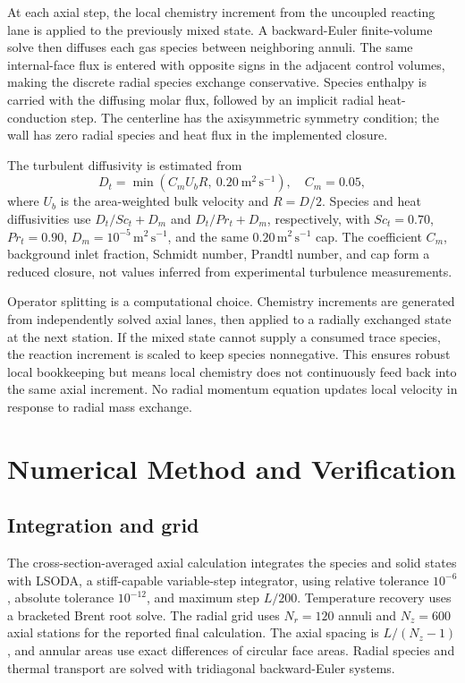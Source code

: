 \documentclass[journal]{IEEEtran}
\begin{document}
At each axial step, the local chemistry increment from the uncoupled reacting lane is applied to the previously mixed state. A backward-Euler finite-volume solve then diffuses each gas species between neighboring annuli. The same internal-face flux is entered with opposite signs in the adjacent control volumes, making the discrete radial species exchange conservative. Species enthalpy is carried with the diffusing molar flux, followed by an implicit radial heat-conduction step. The centerline has the axisymmetric symmetry condition; the wall has zero radial species and heat flux in the implemented closure.

The turbulent diffusivity is estimated from
\begin{equation}
D_t = \min(C_m U_b R,\ 0.20~\mathrm{m^2\,s^{-1}}), \quad C_m=0.05,
\end{equation}
where \(U_b\) is the area-weighted bulk velocity and \(R=D/2\). Species and heat diffusivities use \(D_t/Sc_t+D_m\) and \(D_t/Pr_t+D_m\), respectively, with \(Sc_t=0.70\), \(Pr_t=0.90\), \(D_m=10^{-5}\,\mathrm{m^2\,s^{-1}}\), and the same \(0.20\,\mathrm{m^2\,s^{-1}}\) cap. The coefficient \(C_m\), background inlet fraction, Schmidt number, Prandtl number, and cap form a reduced closure, not values inferred from experimental turbulence measurements.

Operator splitting is a computational choice. Chemistry increments are generated from independently solved axial lanes, then applied to a radially exchanged state at the next station. If the mixed state cannot supply a consumed trace species, the reaction increment is scaled to keep species nonnegative. This ensures robust local bookkeeping but means local chemistry does not continuously feed back into the same axial increment. No radial momentum equation updates local velocity in response to radial mass exchange.

\section{Numerical Method and Verification}
\subsection{Integration and grid}
The cross-section-averaged axial calculation integrates the species and solid states with LSODA, a stiff-capable variable-step integrator, using relative tolerance \(10^{-6}\), absolute tolerance \(10^{-12}\), and maximum step \(L/200\). Temperature recovery uses a bracketed Brent root solve. The radial grid uses \(N_r=120\) annuli and \(N_z=600\) axial stations for the reported final calculation. The axial spacing is \(L/(N_z-1)\), and annular areas use exact differences of circular face areas. Radial species and thermal transport are solved with tridiagonal backward-Euler systems.
\end{document}
